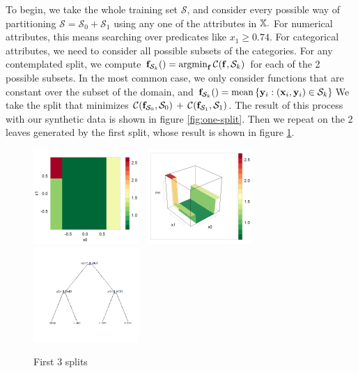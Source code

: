 \documentclass[11pt,openany,american,usenames,dvipsnames,svgnames,x11names,table,isodate]{article}
\numberwithin{equation}{section}
\numberwithin{figure}{section}
\DeclareMathOperator*{\argmin}{argmin}
\begin{document}
To begin, we take the whole training set $\mathcal{S}$, and consider
every possible way of partitioning $\mathcal{S}=\mathcal{S}_{0}+\mathcal{S}_{1}$
using any one of the attributes in $\mathbb{X}.$ For numerical attributes,
this means searching over predicates like $x_{1}\geq0.74$. For categorical
attributes, we need to consider all possible subsets of the categories.
For any contemplated split, we compute $\f_{\mathcal{S}_{k}}()=\argmin_{\f}\cost(\f,\mathcal{S}_{k})$
for each of the 2 possible subsets. In the most common case, we only
consider functions that are constant over the subset of the domain,
and ${\mathbf f}_{\mathcal{S}_{k}}()=\text{mean}\left\{ {\mathbf y}_{i}:({\mathbf x}_{i},{\mathbf y}_{i})\in\mathcal{S}_{k}\right\} $We
take the split that minimizes $\mathcal{C}({\mathbf f}_{\mathcal{S}_{0}},\mathcal{S}_{0})\,+\,\mathcal{C}({\mathbf f}_{\mathcal{S}_{1}},\mathcal{S}_{1})$.
The result of this process with our synthetic data is shown in figure
\ref{fig:one-split}. Then we repeat on the 2 leaves generated by
the first split, whose result is shown in figure \ref{fig:3-spits}.

\begin{figure}
\noindent \begin{centering}
\includegraphics[width=40mm]{fig/rpart-3-split-levelplot}~
\includegraphics[width=40mm]{fig/rpart-3-split-wireframe}~
\includegraphics[width=40mm]{fig/rpart-3-split-tree}
\par\end{centering}

\protect\caption{\label{fig:3-spits}First 3 splits}
\end{figure}
\end{document}
